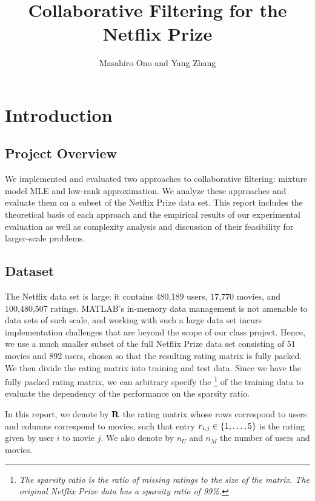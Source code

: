 \documentclass{article}
\title{Collaborative Filtering for the Netflix Prize}
\author{Masahiro Ono and Yang Zhang}
\begin{document}
\maketitle

\tableofcontents

\section{Introduction}

\subsection{Project Overview}

We implemented and evaluated two approaches to collaborative
filtering: mixture model MLE and low-rank approximation. We analyze
these approaches and evaluate them on a subset of the Netflix Prize
data set. This report includes the theoretical basis of each approach
and the empirical results of our experimental evaluation as well as
complexity analysis and discussion of their feasibility for
larger-scale problems.


\subsection{Dataset}

The Netflix data set is large: it contains 480,189 users, 17,770
movies, and 100,480,507 ratings. MATLAB's in-memory data management is
not amenable to data sets of such scale, and working with such a large
data set incurs implementation challenges that are beyond the scope of
our class project. Hence, we use a much smaller subset of the full
Netflix Prize data set consisting of 51 movies and 892 users, chosen so
that the resulting rating matrix is fully packed. We then divide the
rating matrix into training and test data. Since we have the fully
packed rating matrix, we can arbitrary specify the \footnote{\textit{The sparsity ratio is the ratio of missing
    ratings to the size of the matrix. The original Netflix Prize data
    has a sparsity ratio of 99\%.}} of the training data to evaluate
the dependency of the performance on the sparsity ratio.

In this report, we denote by ${\bf R}$ the rating matrix whose rows
correspond to users and columns correspond to movies, such that entry
$r_{i,j} \in {\left\{ 1, \dots, 5 \right\}}$ is the rating given by user $i$ to movie
$j$. We also denote by $n_U$ and $n_M$ the number of users and movies.
\end{document}
